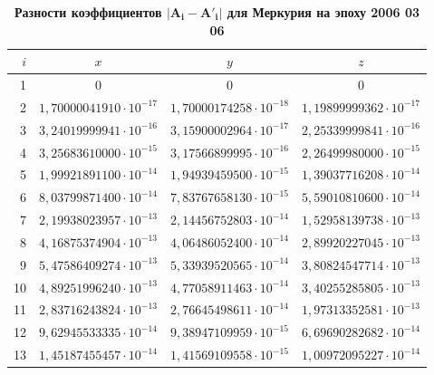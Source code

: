 \begin{table}[p!]
\small \centering
\caption{\bf Разности коэффициентов $\boldsymbol{|A_i-A'_i|}$ для Меркурия на эпоху 2006 03 06}\vspace{-3mm}
\begin{tabular}{r|c|c|c}
\hline	
\footnotesize $i$ & \footnotesize 	$x$	&\footnotesize 	$y$	&\footnotesize 	$z$	\\
\hline
\rule{0mm}{12pt}%
1	&$	0	$&$	0	$&$	0	$\\
2	&$	1,70000041910\cdot 10^{-17}	$&$	1,70000174258\cdot 10^{-18}	$&$	1,19899999362\cdot 10^{-17}	 $\\
3	&$	3,24019999941\cdot 10^{-16}	$&$	3,15900002964\cdot 10^{-17}	$&$	2,25339999841\cdot 10^{-16}	 $\\
4	&$	3,25683610000\cdot 10^{-15}	$&$	3,17566899995\cdot 10^{-16}	$&$	2,26499980000\cdot 10^{-15}	 $\\
5	&$	1,99921891100\cdot 10^{-14}	$&$	1,94939459500\cdot 10^{-15}	$&$	1,39037716208\cdot 10^{-14}	 $\\
6	&$	8,03799871400\cdot 10^{-14}	$&$	7,83767658130\cdot 10^{-15}	$&$	5,59010810600\cdot 10^{-14}	 $\\
7	&$	2,19938023957\cdot 10^{-13}	$&$	2,14456752803\cdot 10^{-14}	$&$	1,52958139738\cdot 10^{-13}	 $\\
8	&$	4,16875374904\cdot 10^{-13}	$&$	4,06486052400\cdot 10^{-14}	$&$	2,89920227045\cdot 10^{-13}	 $\\
9	&$	5,47586409274\cdot 10^{-13}	$&$	5,33939520565\cdot 10^{-14}	$&$	3,80824547714\cdot 10^{-13}	 $\\
10	&$	4,89251996240\cdot 10^{-13}	$&$	4,77058911463\cdot 10^{-14}	$&$	3,40255285805\cdot 10^{-13}	$\\
11	&$	2,83716243824\cdot 10^{-13}	$&$	2,76645498611\cdot 10^{-14}	$&$	1,97313352581\cdot 10^{-13}	$\\
12	&$	9,62945533335\cdot 10^{-14}	$&$	9,38947109959\cdot 10^{-15}	$&$	6,69690282682\cdot 10^{-14}	$\\
13	&$	1,45187455457\cdot 10^{-14}	$&$	1,41569109558\cdot 10^{-15}	$&$	1,00972095227\cdot 10^{-14}	$\\
\hline
\end{tabular}
%


\end{table}
